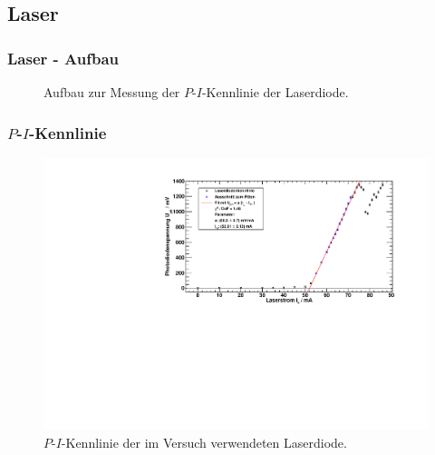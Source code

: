 
\subsection{Laser}



\begin{frame}
\frametitle{Laser - Aufbau}

\begin{figure}
    \centering
    \def\svgwidth{\textwidth}
    
    \caption{Aufbau zur Messung der $P$-$I$-Kennlinie der Laserdiode.}
\end{figure}

\end{frame}






\begin{frame}
\frametitle{$P$-$I$-Kennlinie}

\begin{figure}[H]
    \begin{center}
        \includegraphics[width=\textwidth]{../img/diodenkennlinie.pdf}
        \caption{$P$-$I$-Kennlinie der im Versuch verwendeten Laserdiode.}
    \end{center}
\end{figure}



\end{frame}


